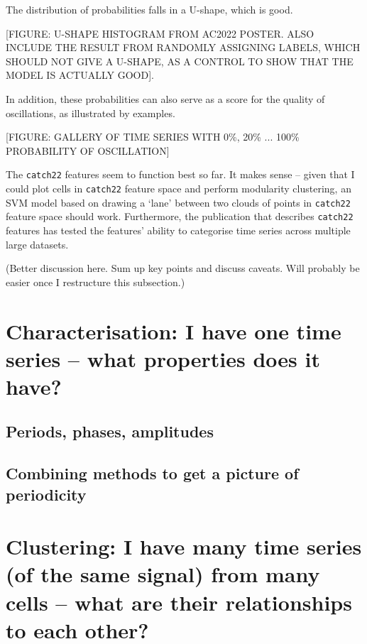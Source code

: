 The distribution of probabilities falls in a U-shape, which is good.

[FIGURE: U-SHAPE HISTOGRAM FROM AC2022 POSTER.  ALSO INCLUDE THE RESULT FROM RANDOMLY ASSIGNING LABELS, WHICH SHOULD NOT GIVE A U-SHAPE, AS A CONTROL TO SHOW THAT THE MODEL IS ACTUALLY GOOD].

In addition, these probabilities can also serve as a score for the quality of oscillations, as illustrated by examples.

[FIGURE: GALLERY OF TIME SERIES WITH 0\%, 20\% ... 100\% PROBABILITY OF OSCILLATION]

The \texttt{catch22} features seem to function best so far.
It makes sense -- given that I could plot cells in \texttt{catch22} feature space and perform modularity clustering, an SVM model based on drawing a `lane' between two clouds of points in \texttt{catch22} feature space should work.
Furthermore, the publication that describes \texttt{catch22} features \parencite{lubbaCatch22CAnonicalTimeseries2019} has tested the features' ability to categorise time series across multiple large datasets.

(Better discussion here.  Sum up key points and discuss caveats.  Will probably be easier once I restructure this subsection.)

\section{Characterisation: I have one time series -- what properties does it have?}
\label{sec:analysis-characterisation}

\subsection{Periods, phases, amplitudes}
\label{subsec:analysis-characterisation-quantities}

\subsection{Combining methods to get a picture of periodicity}
\label{subsec:analysis-characterisation-combined}


\section{Clustering: I have many time series (of the same signal) from many cells -- what are their relationships to each other?}
\label{sec:analysis-clustering}

